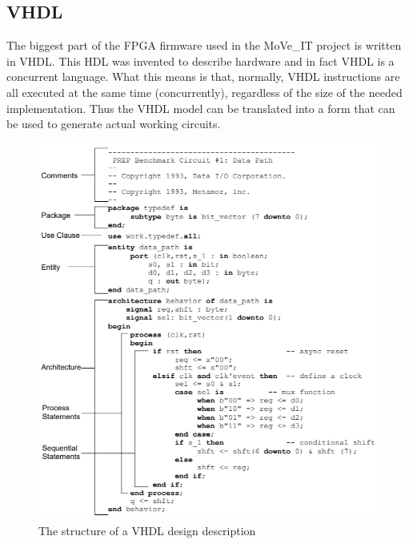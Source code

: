 \subsection{VHDL}
\noindent The biggest part of the FPGA firmware used in the MoVe\_IT project is written in VHDL\cite{vhdl}. This HDL was invented to describe hardware and in fact VHDL is a concurrent language. What this means is that, normally, VHDL instructions are all executed at the same time (concurrently), regardless of the size of the needed implementation. Thus the VHDL model can be translated into a form that can be used to generate actual working circuits.
\begin{figure}[H]
	\centering
	\includegraphics[width=0.7\linewidth]{IMG/ch3/VHDL}
	\caption{The structure of a VHDL design description}
	\label{fig:vhdl}
\end{figure}

